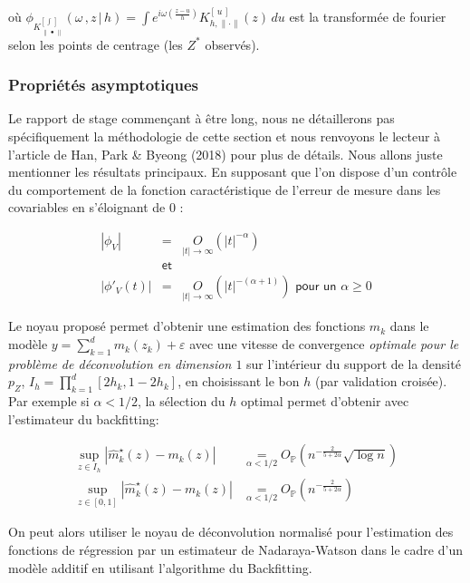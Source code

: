 où $\phi_{K_{\, \lVert \, \bullet \, \rVert}^{[\,\int \,]}}(\omega \,, z\, \vert \, h) = \int e^{i \omega \left(\frac{z-u}{h}\right)} K_{h, \lVert \cdot \rVert}^{[\, u \,]}(z)  \, du$ est la transformée de fourier selon les points de centrage (les $Z^*$ observés).

\subsubsection{Propriétés asymptotiques}

Le rapport de stage commençant à être long, nous ne détaillerons pas spécifiquement la méthodologie de cette section et nous renvoyons le lecteur à l'article de Han, Park \& Byeong (2018) \cite{han2018smooth} pour plus de détails. Nous allons juste mentionner les résultats principaux. En supposant que l'on dispose d'un contrôle du comportement de la fonction caractéristique de l'erreur de mesure dans les covariables en s'éloignant de $0$ : 

\begin{equation}
    \begin{array}{rcl}
        |\phi_V| &=& \underset{|t| \rightarrow \infty} O(|t|^{-\alpha})
        \\
        &\textsf{et}&
        \\
        |\phi'_V(t)| &=& \underset{|t| \rightarrow \infty}{O}\left( |t|^{-(\alpha+1)} \right) \textsf{ pour un }\alpha \geq 0
    \end{array}
\end{equation}

\noindent Le noyau proposé permet d'obtenir une estimation des fonctions $m_k$ dans le modèle $y = \sum_{k=1}^d m_k(z_k) + \varepsilon$ avec une vitesse de convergence \emph{optimale pour le problème de déconvolution en dimension $1$} sur l'intérieur du support de la densité $p_Z$, $I_h = \prod_{k=1}^d[2h_k, 1 -2h_k]$, en choisissant le bon $h$ (par validation croisée). Par exemple si $\alpha < 1/2$, la sélection du $h$ optimal    permet d'obtenir avec l'estimateur du backfitting:

\begin{align}
    \sup_{z \in I_h} \left| \hat m^\star_k(z) - m_k(z) \right| &\underset{\alpha < 1/2}= O_{\mathds P} \left( n^{- \frac{2}{5 + 2 \alpha} }\sqrt{\log n} \right)
    \\
    \sup_{z \in [0,1]} \left| \hat m^\star_k(z) - m_k(z) \right| &\underset{\alpha < 1/2}= O_{\mathds P} \left( n^{- \frac{2}{5 + 2 \alpha} } \right)
\end{align}

\noindent On peut alors utiliser le noyau de déconvolution normalisé pour l'estimation des fonctions de régression par un estimateur de Nadaraya-Watson dans le cadre d'un modèle additif en utilisant l'algorithme du Backfitting. 